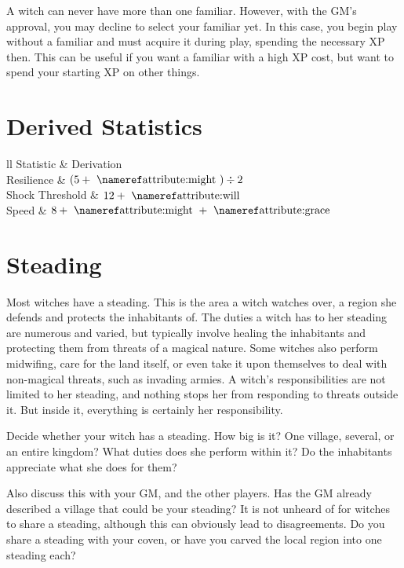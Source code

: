 A witch can never have more than one familiar.
However, with the GM's approval, you may decline to select your familiar yet.
In this case, you begin play without a familiar and must acquire it during play, spending the necessary XP then.
This can be useful if you want a familiar with a high XP cost, but want to spend your starting XP on other things.

\section{Derived Statistics}

\begin{simpletable}{ll}
	\toprule
	Statistic & Derivation\\
	\midrule
	Resilience & $(5 + \text{\attref{might}}) \div 2$\\
	Shock Threshold & $12 + \text{\attref{will}}$\\
	Speed & $8 + \text{\attref{might}} + \text{\attref{grace}}$\\
	\bottomrule
\end{simpletable}

\section{Steading}

Most witches have a steading.
This is the area a witch watches over, a region she defends and protects the inhabitants of.
The duties a witch has to her steading are numerous and varied, but typically involve healing the inhabitants and protecting them from threats of a magical nature.
Some witches also perform midwifing, care for the land itself, or even take it upon themselves to deal with non-magical threats, such as invading armies.
A witch's responsibilities are not limited to her steading, and nothing stops her from responding to threats outside it.
But inside it, everything is certainly her responsibility.

Decide whether your witch has a steading.
How big is it?
One village, several, or an entire kingdom?
What duties does she perform within it?
Do the inhabitants appreciate what she does for them?

Also discuss this with your GM, and the other players.
Has the GM already described a village that could be your steading?
It is not unheard of for witches to share a steading, although this can obviously lead to disagreements.
Do you share a steading with your coven, or have you carved the local region into one steading each?
